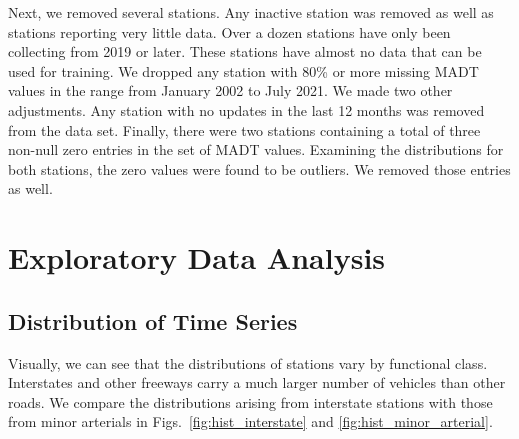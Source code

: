 \documentclass[9pt,twocolumn,twoside, lineno]{jost-new}
\numberwithin{subsection}{section}
\begin{document}
Next, we removed several stations.
Any inactive station was removed as well as stations reporting very little data.
Over a dozen stations have only been collecting from 2019 or later.
These stations have almost no data that can be used for training.
We dropped any station with 80\% or more missing MADT values in the range from January 2002 to July 2021.
We made two other adjustments.
Any station with no updates in the last 12 months was removed from the data set.
Finally, there were two stations containing a total of three non-null zero entries in the set of MADT values.
Examining the distributions for both stations, the zero values were found to be outliers.
We removed those entries as well.


\section{Exploratory Data Analysis}\label{sec:exploratory-data-analysis}
\subsection{Distribution of Time Series}
Visually, we can see that the distributions of stations vary by functional class.
Interstates and other freeways carry a much larger number of vehicles than other roads.
We compare the distributions arising from interstate stations with those from minor arterials in Figs.~\ref{fig:hist_interstate} and \ref{fig:hist_minor_arterial}.
\end{document}
